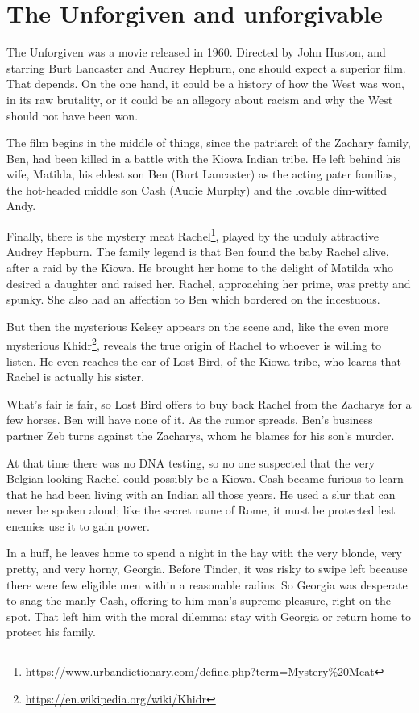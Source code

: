 \section{The Unforgiven and unforgivable}

The Unforgiven was a movie released in 1960. Directed by John Huston, and starring Burt Lancaster and Audrey Hepburn, one should expect a superior film. That depends. On the one hand, it could be a history of how the West was won, in its raw brutality, or it could be an allegory about racism and why the West should not have been won.

The film begins in the middle of things, since the patriarch of the Zachary family, Ben, had been killed in a battle with the Kiowa Indian tribe. He left behind his wife, Matilda, his eldest son Ben (Burt Lancaster) as the acting pater familias, the hot-headed middle son Cash (Audie Murphy) and the lovable dim-witted Andy.

Finally, there is the mystery meat Rachel\footnote{\url{https://www.urbandictionary.com/define.php?term=Mystery\%20Meat}}, played by the unduly attractive Audrey Hepburn. The family legend is that Ben found the baby Rachel alive, after a raid by the Kiowa. He brought her home to the delight of Matilda who desired a daughter and raised her. Rachel, approaching her prime, was pretty and spunky. She also had an affection to Ben which bordered on the incestuous.

But then the mysterious Kelsey appears on the scene and, like the even more mysterious Khidr\footnote{\url{https://en.wikipedia.org/wiki/Khidr}}, reveals the true origin of Rachel to whoever is willing to listen. He even reaches the ear of Lost Bird, of the Kiowa tribe, who learns that Rachel is actually his sister.

What's fair is fair, so Lost Bird offers to buy back Rachel from the Zacharys for a few horses. Ben will have none of it. As the rumor spreads, Ben's business partner Zeb turns against the Zacharys, whom he blames for his son's murder.

At that time there was no DNA testing, so no one suspected that the very Belgian looking Rachel could possibly be a Kiowa. Cash became furious to learn that he had been living with an Indian all those years. He used a slur that can never be spoken aloud; like the secret name of Rome, it must be protected lest enemies use it to gain power.

In a huff, he leaves home to spend a night in the hay with the very blonde, very pretty, and very horny, Georgia. Before Tinder, it was risky to swipe left because there were few eligible men within a reasonable radius. So Georgia was desperate to snag the manly Cash, offering to him man's supreme pleasure, right on the spot. That left him with the moral dilemma: stay with Georgia or return home to protect his family.

